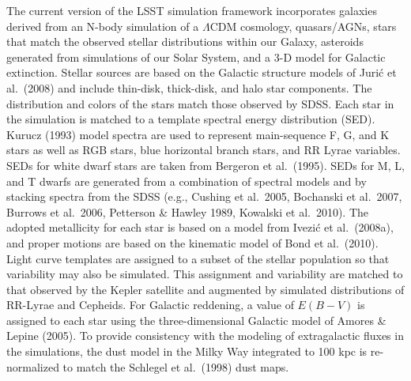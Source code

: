{The current version of the LSST simulation framework incorporates
galaxies derived from an N-body simulation of a $\Lambda$CDM
cosmology, quasars/AGNs, stars that match the observed stellar
distributions within our Galaxy, asteroids generated from simulations
of our Solar System, and a 3-D model for Galactic extinction.  Stellar
sources are based on the Galactic structure models of Juri\'{c} et
al.~(2008) and include thin-disk, thick-disk, and halo star
components. The distribution and colors of the stars match those
observed by SDSS. Each star in the simulation is matched to a template
spectral energy distribution (SED). Kurucz (1993) model spectra are
used to represent main-sequence F, G, and K stars as well as RGB
stars, blue horizontal branch stars, and RR Lyrae variables.  SEDs for
white dwarf stars are taken from Bergeron et al.~(1995).  SEDs for M,
L, and T dwarfs are generated from a combination of spectral models
and by stacking spectra from the SDSS (e.g., Cushing et al.~2005,
Bochanski et al.~2007, Burrows et al.~2006, Petterson \& Hawley 1989,
Kowalski et al.~2010). The adopted metallicity for each star is based
on a model from Ivezi\'{c} et al.~(2008a), and proper motions are
based on the kinematic model of Bond et al.~(2010).  Light curve
templates are assigned to a subset of the stellar population so that
variability may also be simulated. This assignment and variability are
matched to that observed by the Kepler satellite and augmented by
simulated distributions of RR-Lyrae and Cepheids. For Galactic reddening, a
value of $E(B-V)$ is assigned to each star using the three-dimensional
Galactic model of Amores \& Lepine (2005). To provide consistency with
the modeling of extragalactic fluxes in the simulations, the dust model in the Milky Way integrated
to 100 kpc is re-normalized to match the Schlegel et al.~(1998) dust maps.

}
